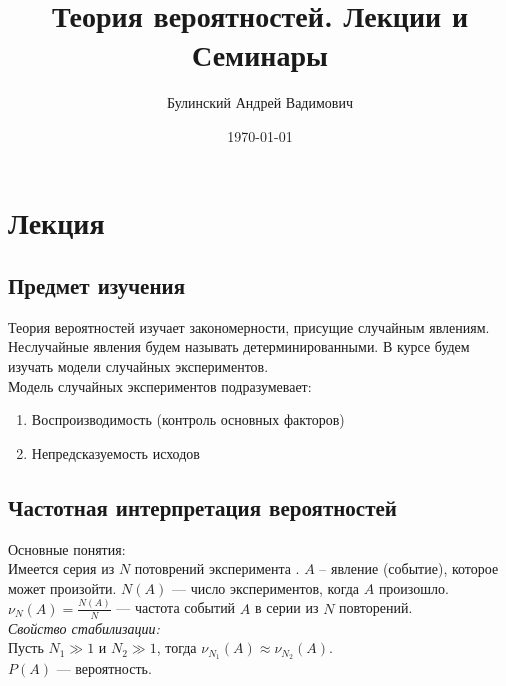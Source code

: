 \documentclass[a4paper, 12pt]{article}
\author{Булинский Андрей Вадимович}
\title{Теория вероятностей. Лекции и Семинары}
\date{\today}
\begin{document}
\maketitle
{}
\newpage
\tableofcontents
{}
\newpage
\section{Лекция }
\subsection{Предмет изучения}
Теория вероятностей изучает закономерности, присущие случайным явлениям. Неслучайные явления будем называть детерминированными. В курсе будем изучать модели случайных экспериментов.\\
Модель случайных экспериментов подразумевает:
\begin{enumerate}
\item Воспроизводимость (контроль основных факторов)
\item Непредсказуемость исходов
\end{enumerate}
\subsection{Частотная интерпретация вероятностей}
Основные понятия:\\
Имеется серия из $N$ потоврений эксперимента . $A$ – явление (событие), которое может произойти. $N(A)$ — число экспериментов, когда $A$ произошло. $\nu_N\left(A\right)=\frac{N\left(A\right)}{N}$ — частота событий $A$ в серии из $N$ повторений.\\
\textit{Свойство стабилизации:\\}
Пусть $N_1\gg 1$ и $N_2\gg 1$, тогда $\nu_{N_1}\left(A\right)\approx\nu_{N_2}\left(A\right)$.\\
$P\left(A\right)$ — вероятность.
\end{document}

